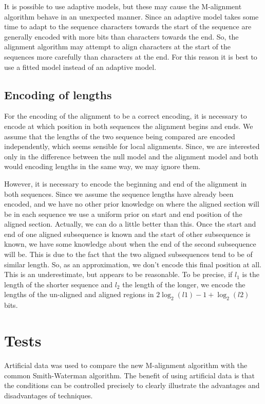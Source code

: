\documentclass[letterpaper,11pt,oneside]{article}
\begin{document}
It is possible to use adaptive models, but these may cause the M-alignment
algorithm behave in an unexpected manner.  Since an adaptive model takes some
time to adapt to the sequence characters towards the start of the sequence are
generally encoded with more bits than characters towards the end.  So, the
alignment algorithm may attempt to align characters at the start of the
sequences more carefully than characters at the end.  For this reason it is
best to use a fitted model instead of an adaptive model.

\subsection{Encoding of lengths}

For the encoding of the alignment to be a correct encoding, it is necessary to
encode at which position in both sequences the alignment begins and ends.  We
assume that the lengths of the two sequence being compared are encoded
independently, which seems sensible for local alignments.  Since, we are
interested only in the difference between the null model and the alignment
model and both would encoding lengths in the same way, we may ignore them.

However, it is necessary to encode the beginning and end of the alignment in
both sequences.  Since we assume the sequence lengths have already been
encoded, and we have no other prior knowledge on where the aligned section
will be in each sequence we use a uniform prior on start and end position of
the aligned section.  Actually, we can do a little better than this.  Once the
start and end of one aligned subsequence is known and the start of other
subsequence is known, we have some knowledge about when the end of the second
subsequence will be.  This is due to the fact that the two aligned
subsequences tend to be of similar length.  So, as an approximation, we don't
encode this final position at all.  This is an underestimate, but appears to
be reasonable.  To be precise, if $l_1$ is the length of the shorter sequence
and $l_2$ the length of the longer, we encode the lengths of the un-aligned
and aligned regions in $2\log_2(l1) - 1 + \log_2(l2)$ bits.



\section{Tests}

Artificial data was used to compare the new M-alignment algorithm with the
common Smith-Waterman algorithm.  The benefit of using artificial data is that
the conditions can be controlled precisely to clearly illustrate the
advantages and disadvantages of techniques.
\end{document}

